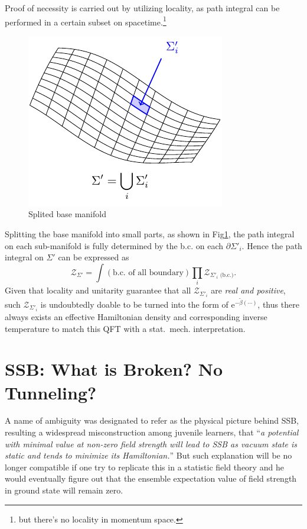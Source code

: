 Proof of necessity is carried out by utilizing locality, as path integral can be performed in a certain subset on spacetime.\footnote{but there's no locality in momentum space.}
\begin{figure}
    \centering
    \includegraphics{figures/splited_base_manifold.pdf}
    \caption{Splited base manifold}
    \label{split_manifold}
\end{figure}
Splitting the base manifold into small parts, as shown in Fig\ref{split_manifold}, the path integral on each sub-manifold is fully determined by the b.c. on each $\partial\Sigma'_{i}$. Hence the path integral on $\Sigma'$ can be expressed as
\begin{equation}
    \mathcal{Z}_{\Sigma'} = \int \left( \text{b.c. of all boundary} \right) \prod_{i} \mathcal{Z}_{\Sigma' _{i} \text{ (b.c.)}}.
\end{equation}
Given that locality and unitarity guarantee that all $\mathcal{Z}_{\Sigma'_{i}}$ are \emph{real and positive}, such $\mathcal{Z}_{\Sigma'_{i}}$ is undoubtedly doable to be turned into the form of $\mathrm{e}^{- \tilde{\beta} \left( \cdots \right) }$, thus there always exists an effective Hamiltonian density and corresponding inverse temperature to match this QFT with a stat.~mech. interpretation.



\section[When do Symmetries Break Spontaneously]{SSB: What is Broken? No Tunneling?}

A name of ambiguity was designated to refer as the physical picture behind SSB, resulting a widespread misconstruction among juvenile learners, that ``\emph{a potential with minimal value at non-zero field strength will lead to SSB as vacuum state is static and tends to minimize its Hamiltonian.}'' But such explanation will be no longer compatible if one try to replicate this in a statistic field theory and he would eventually figure out that the ensemble expectation value of field strength in ground state will remain zero. 